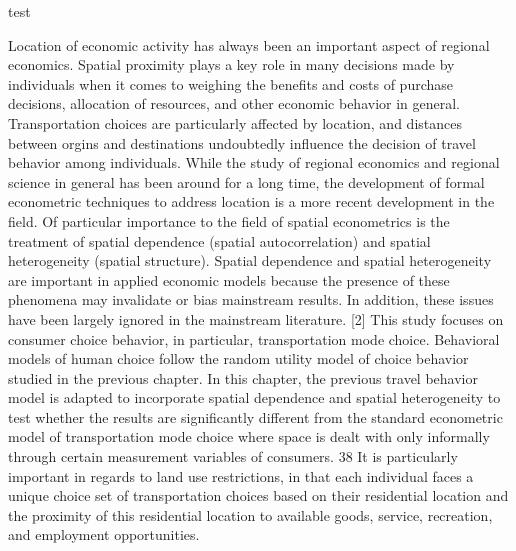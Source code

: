 test

Location of economic activity has always been an important aspect of regional economics. Spatial proximity plays a key role in many decisions made by individuals when it comes to weighing the benefits and costs of purchase decisions, allocation of resources, and other economic behavior in general. Transportation choices are particularly affected by location, and distances between orgins and destinations undoubtedly influence the decision of travel behavior among individuals.
While the study of regional economics and regional science in general has been around for a long time, the development of formal econometric techniques to address location is a more recent development in the field. Of particular importance to the field of spatial econometrics is the treatment of spatial dependence (spatial autocorrelation) and spatial heterogeneity
(spatial structure). Spatial dependence and spatial heterogeneity are important in applied economic models because the presence of these phenomena may invalidate or bias mainstream results. In addition, these issues have been largely ignored in the mainstream literature. [2]
This study focuses on consumer choice behavior, in particular, transportation mode choice. Behavioral models of human choice follow the random utility model of choice behavior studied in the previous chapter. In this chapter, the previous travel behavior model is adapted to incorporate spatial dependence and spatial heterogeneity to test whether the results are significantly different from the standard econometric model of transportation mode choice where space is dealt with only informally through certain measurement variables of consumers.
38
It is particularly important in regards to land use restrictions, in that each individual faces a unique choice set of transportation choices based on their residential location and the proximity of this residential location to available goods, service, recreation, and employment opportunities.

